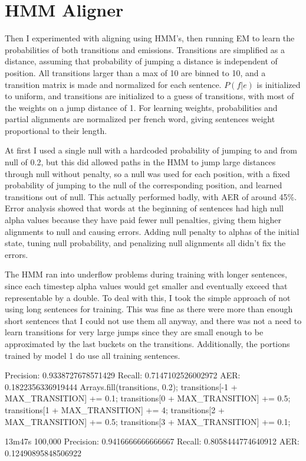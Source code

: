 \documentclass[11pt]{article}
\begin{document}
\section{HMM Aligner}

Then I experimented with aligning using HMM's, then running EM to learn the probabilities of
both transitions and emissions. Transitions are simplified as a distance, assuming that
probability of jumping a distance is independent of position. All transitions larger than
a max of 10 are binned to 10, and a transition matrix is made and normalized for each sentence. 
$P(f|e)$ is initialized to uniform, and transitions
are initialized to a guess of transitions, with most of the weights on a jump distance of 1.
For learning weights, probabilities and partial alignments are normalized per french word,
giving sentences weight proportional to their length.

At first I used a single null with a hardcoded probability of jumping to and from null of 0.2,
but this did allowed paths in the HMM to jump large distances through null without penalty,
so a null was used for each position, with a fixed probability of jumping to the null of 
the corresponding position, and learned transitions out of null. This actually performed
badly, with AER of around 45\%. Error analysis showed that words at the beginning of sentences
had high null alpha values because they have paid fewer null penalties, 
giving them higher alignments to null and causing errors. Adding null penalty to alphas of
the initial state, tuning null probability, and penalizing null alignments 
all didn't fix the errors. 


The HMM ran into underflow problems during training with longer sentences, since each
timestep alpha values would get smaller and eventually exceed that representable by a double.
To deal with this, I took the simple approach of not using long sentences for training.
This was fine as there were more than enough short sentences that I could not use them all
anyway, and there was not a need to learn transitions for very large jumps since they
are small enough to be approximated by the last buckets on the transitions. Additionally,
the portions trained by model 1 do use all training sentences.

Precision: 0.9338727678571429
Recall: 0.7147102526002972
AER: 0.1822356336919444
		Arrays.fill(transitions, 0.2);
		transitions[-1 + MAX_TRANSITION] += 0.1;
		transitions[0 + MAX_TRANSITION] += 0.5;
		transitions[1 + MAX_TRANSITION] += 4;
		transitions[2 + MAX_TRANSITION] += 0.5;
		transitions[3 + MAX_TRANSITION] += 0.1;

13m47s 100,000
Precision: 0.9416666666666667
Recall: 0.8058444774640912
AER: 0.12490895848506922
\end{document}
